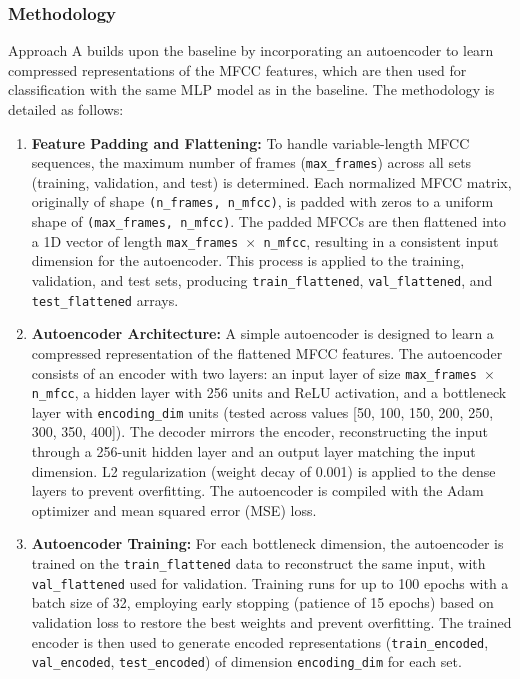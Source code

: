 \documentclass[12pt]{article}
\begin{document}
\subsubsection{Methodology}

Approach A builds upon the baseline by incorporating an autoencoder to learn compressed representations of the MFCC features, which are then used for classification with the same MLP model as in the baseline. The methodology is detailed as follows:

\begin{enumerate}
    \item \textbf{Feature Padding and Flattening:}
   To handle variable-length MFCC sequences, the maximum number of frames (\texttt{max\_frames}) across all sets (training, validation, and test) is determined. Each normalized MFCC matrix, originally of shape \texttt{(n\_frames, n\_mfcc)}, is padded with zeros to a uniform shape of \texttt{(max\_frames, n\_mfcc)}. The padded MFCCs are then flattened into a 1D vector of length \texttt{max\_frames $\times$ n\_mfcc}, resulting in a consistent input dimension for the autoencoder. This process is applied to the training, validation, and test sets, producing \texttt{train\_flattened}, \texttt{val\_flattened}, and \texttt{test\_flattened} arrays.

   \item \textbf{Autoencoder Architecture:}
   A simple autoencoder is designed to learn a compressed representation of the flattened MFCC features. The autoencoder consists of an encoder with two layers: an input layer of size \texttt{max\_frames $\times$ n\_mfcc}, a hidden layer with 256 units and ReLU activation, and a bottleneck layer with \texttt{encoding\_dim} units (tested across values [50, 100, 150, 200, 250, 300, 350, 400]). The decoder mirrors the encoder, reconstructing the input through a 256-unit hidden layer and an output layer matching the input dimension. L2 regularization (weight decay of 0.001) is applied to the dense layers to prevent overfitting. The autoencoder is compiled with the Adam optimizer and mean squared error (MSE) loss.

   \item \textbf{Autoencoder Training:}
   For each bottleneck dimension, the autoencoder is trained on the \texttt{train\_flattened} data to reconstruct the same input, with \texttt{val\_flattened} used for validation. Training runs for up to 100 epochs with a batch size of 32, employing early stopping (patience of 15 epochs) based on validation loss to restore the best weights and prevent overfitting. The trained encoder is then used to generate encoded representations (\texttt{train\_encoded}, \texttt{val\_encoded}, \texttt{test\_encoded}) of dimension \texttt{encoding\_dim} for each set.


\end{enumerate}
\end{document}
